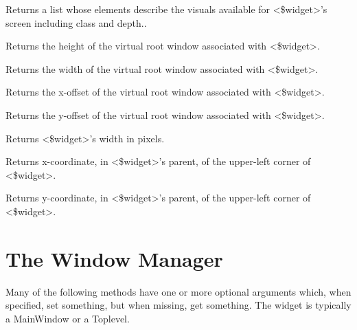 \begin{enum}{1cm}
Returns a list whose elements describe the visuals available for
<\$widget>'s screen including class and depth..

Returns the height of the virtual root window associated with <\$widget>.

Returns the width of the virtual root window associated with <\$widget>.

Returns the x-offset of the virtual root window associated with <\$widget>.

Returns the y-offset of the virtual root window associated with <\$widget>.

Returns <\$widget>'s width in  pixels.

Returns x-coordinate, in <\$widget>'s parent, of the upper-left corner of
<\$widget>.

Returns y-coordinate, in <\$widget>'s parent, of the upper-left corner of
<\$widget>.

\end{enum}


\section{The Window Manager}

Many of the following methods have one or more optional arguments
which, when specified, set something, but when missing, get something.
The widget is typically a MainWindow or a Toplevel.

